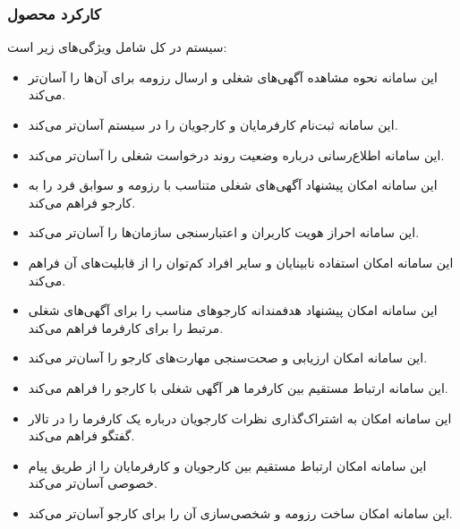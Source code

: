 \documentclass[12pt]{article}
\begin{document}
	\subsubsection{کارکرد محصول}
	سیستم در کل شامل ویژگی‌های زیر است:
	\begin{itemize}
		\item
		این سامانه نحوه مشاهده آگهی‌های شغلی و ارسال رزومه برای آن‌ها را آسان‌تر می‌کند.
		\item
		این سامانه ثبت‌نام کارفرمایان و کارجویان را در سیستم آسان‌تر می‌کند.
		\item
		این سامانه اطلاع‌رسانی درباره وضعیت روند درخواست شغلی را آسان‌تر می‌کند.
		\item
		این سامانه امکان پیشنهاد آگهی‌های شغلی متناسب با رزومه و سوابق فرد را به کارجو فراهم می‌کند.
		\item
		این سامانه احراز‌ هویت کاربران و اعتبارسنجی سازمان‌ها را آسان‌تر می‌کند.
		\item
		این سامانه امکان استفاده نابینایان و سایر افراد کم‌توان را از قابلیت‌های آن فراهم‌ می‌کند.
		\item
		این سامانه امکان پیشنهاد هدفمندانه کارجو‌های مناسب را برای آگهی‌های شغلی مرتبط را برای کارفرما فراهم می‌کند.
		\item
		این سامانه امکان ارزیابی و صحت‌سنجی مهارت‌های کارجو را آسان‌تر می‌کند.
		\item
		این سامانه ارتباط مستقیم بین کارفرما هر آگهی شغلی با کارجو را فراهم می‌کند.
		\item
		این سامانه امکان به اشتراک‌گذاری نظرات کارجویان درباره یک کارفرما را در تالار گفتگو فراهم می‌کند.
		\item
		این سامانه امکان ارتباط مستقیم بین کارجویان و کارفرمایان را از طریق پیام خصوصی آسان‌تر می‌کند.
		\item
		این سامانه امکان ساخت رزومه و شخصی‌سازی آن‌ را برای کارجو آسان‌تر می‌کند.
	\end{itemize}
\end{document}
